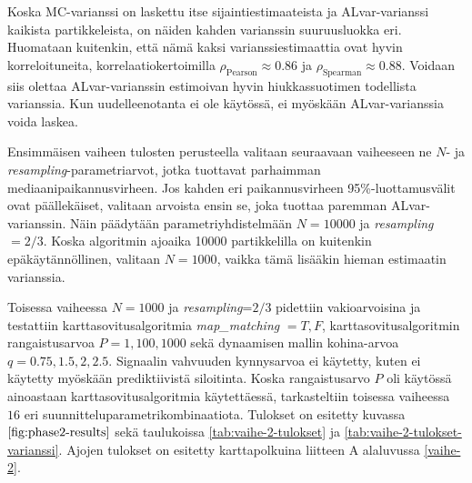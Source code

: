 \documentclass[
  12pt,
  a4paper, twoside]{book}
\begin{document}
Koska MC-varianssi on laskettu itse sijaintiestimaateista ja ALvar-varianssi kaikista partikkeleista, on näiden kahden varianssin suuruusluokka eri. Huomataan kuitenkin, että nämä kaksi varianssiestimaattia ovat hyvin korreloituneita, korrelaatiokertoimilla \(\rho_\text{Pearson} \approx 0.86\) ja \(\rho_\text{Spearman} \approx 0.88\). Voidaan siis olettaa ALvar-varianssin estimoivan hyvin hiukkassuotimen todellista varianssia. Kun uudelleenotanta ei ole käytössä, ei myöskään ALvar-varianssia voida laskea.

Ensimmäisen vaiheen tulosten perusteella valitaan seuraavaan vaiheeseen ne \(N\)- ja \emph{resampling}-parametriarvot, jotka tuottavat parhaimman mediaanipaikannusvirheen. Jos kahden eri paikannusvirheen 95\%-luottamusvälit ovat päällekäiset, valitaan arvoista ensin se, joka tuottaa paremman ALvar-varianssin. Näin päädytään parametriyhdistelmään \(N=10000\) ja \emph{resampling} \(=2/3\). Koska algoritmin ajoaika 10000 partikkelilla on kuitenkin epäkäytännöllinen, valitaan \(N=1000\), vaikka tämä lisääkin hieman estimaatin varianssia.

Toisessa vaiheessa \(N=1000\) ja \emph{resampling}=\(2/3\) pidettiin vakioarvoisina ja testattiin karttasovitusalgoritmia \emph{map\_matching} \(={T,F}\), karttasovitusalgoritmin rangaistusarvoa \(P={1,100,1000}\) sekä dynaamisen mallin kohina-arvoa \(q={0.75,1.5,2,2.5}\). Signaalin vahvuuden kynnysarvoa ei käytetty, kuten ei käytetty myöskään prediktiivistä siloitinta. Koska rangaistusarvo \(P\) oli käytössä ainoastaan karttasovitusalgoritmia käytettäessä, tarkasteltiin toisessa vaiheessa \(16\) eri suunnitteluparametrikombinaatiota. Tulokset on esitetty kuvassa \(\ref{fig:phase2-results}\) sekä taulukoissa \ref{tab:vaihe-2-tulokset} ja \ref{tab:vaihe-2-tulokset-varianssi}. Ajojen tulokset on esitetty karttapolkuina liitteen A alaluvussa \ref{vaihe-2}.
\end{document}
